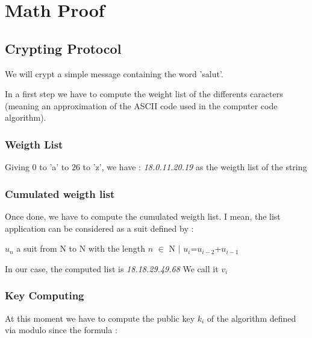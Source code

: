 \documentclass[letterpaper,10pt,english]{sphinxmanual}
\begin{document}
\chapter{Math Proof}
\label{\detokenize{Math_proof:math-proof}}\label{\detokenize{Math_proof::doc}}



\section{Crypting Protocol}

\begin{flushleft}
We will crypt a simple message containing the word 'salut'.

In a first step we have to compute the weight list of the differents caracters (meaning an approximation of the ASCII code used in the computer code algorithm).
\end{flushleft}

\subsection{Weigth List}
\begin{flushleft}
Giving 0 to 'a' to 26 to 'z', we have : \textit{18.0.11.20.19} as the weigth list of the string
\end{flushleft}

\subsection{Cumulated weigth list}

\begin{flushleft}
Once done, we have to compute the cumulated weigth list.
I mean, the list application can be considered as a suit defined by : 
\end{flushleft}

\begin{center}
$u_{n}$ a suit from N to N with the length $n$ $ \in $ N \quad $ \vert $ \quad $u_{i}$=$u_{i-2}$+$u_{i-1}$
\end{center}

In our case, the computed list is \textit{18.18.29.49.68}
We call it $v_{i}$
\subsection{Key Computing}

\begin{flushleft}
At this moment we have to compute the public key $k_{i}$ of the algorithm defined via modulo since the formula :
\end{flushleft}
\end{document}
